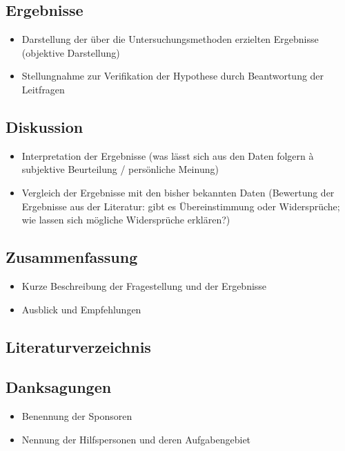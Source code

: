 \subsection*{Ergebnisse}

\begin{itemize}
	\item Darstellung der über die Untersuchungsmethoden erzielten Ergebnisse (objektive Darstellung)
	\item Stellungnahme zur Verifikation der Hypothese durch Beantwortung der Leitfragen
\end{itemize}

\subsection*{Diskussion}

\begin{itemize}
	\item Interpretation der Ergebnisse (was lässt sich aus den Daten folgern à subjektive Beurteilung / persönliche Meinung)
	\item Vergleich der Ergebnisse mit den bisher bekannten Daten (Bewertung der Ergebnisse aus der Literatur: gibt es Übereinstimmung oder Widersprüche; wie lassen sich mögliche Widersprüche erklären?)
\end{itemize}

\subsection*{Zusammenfassung}

\begin{itemize}
	\item Kurze Beschreibung der Fragestellung und der Ergebnisse
	\item Ausblick und Empfehlungen
\end{itemize}

\subsection*{Literaturverzeichnis}

\subsection*{Danksagungen}

\begin{itemize}
	\item Benennung der Sponsoren
	\item Nennung der Hilfspersonen und deren Aufgabengebiet
\end{itemize}

